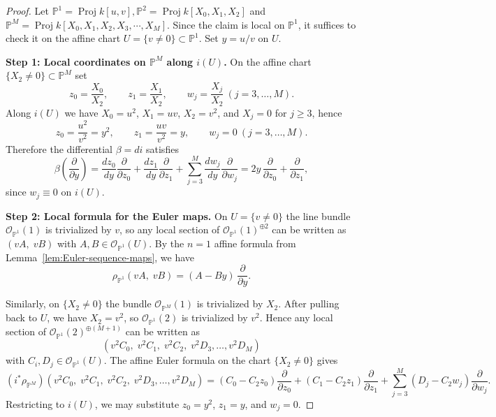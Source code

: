 \documentclass[11pt,twoside]{amsart}
\theoremstyle{plain}
\numberwithin{equation}{section}
\theoremstyle{definition}
\newcommand{\PP}{\mathbb{P}}
\newcommand{\OO}{\mathcal{O}}
\begin{document}
\begin{proof}
Let $\mathbb{P}^1 = \operatorname{Proj}k[u,v], \mathbb{P}^2 = \operatorname{Proj}k[X_0,X_1,X_2]$ and $\mathbb{P}^M = \operatorname{Proj}k[X_0,X_1,X_2,X_3,\cdots, X_M]$.  Since the claim is local on $\PP^1$, it suffices to check it on the affine chart
$U=\{v\neq 0\}\subset \PP^1$.  Set $y=u/v$ on $U$.

\medskip
\noindent\textbf{Step 1: Local coordinates on $\PP^M$ along $i(U)$.}
On the affine chart $\{X_2\neq 0\}\subset \PP^M$ set
\[
z_0=\frac{X_0}{X_2},\qquad z_1=\frac{X_1}{X_2},\qquad w_j=\frac{X_j}{X_2}\ (j=3,\dots,M).
\]
Along $i(U)$ we have $X_0=u^2$, $X_1=uv$, $X_2=v^2$, and $X_j=0$ for $j\ge 3$, hence
\[
z_0=\frac{u^2}{v^2}=y^2,\qquad z_1=\frac{uv}{v^2}=y,\qquad w_j=0\ (j=3,\dots,M).
\]
Therefore the differential $\beta=di$ satisfies
\begin{equation}\label{eq:beta-local-PM}
\beta\!\left(\frac{\partial}{\partial y}\right)
=
\frac{d z_0}{d y}\frac{\partial}{\partial z_0}
+\frac{d z_1}{d y}\frac{\partial}{\partial z_1}
+\sum_{j=3}^M \frac{d w_j}{d y}\frac{\partial}{\partial w_j}
=
2y\,\frac{\partial}{\partial z_0}+\frac{\partial}{\partial z_1},
\end{equation}
since $w_j\equiv 0$ on $i(U)$.

\medskip
\noindent\textbf{Step 2: Local formula for the Euler maps.}
On $U=\{v\neq 0\}$ the line bundle $\OO_{\PP^1}(1)$ is trivialized by $v$, so any local
section of $\OO_{\PP^1}(1)^{\oplus 2}$ can be written as $(vA,\;vB)$ with
$A,B\in \OO_{\PP^1}(U)$.  By the $n=1$ affine formula from Lemma~\ref{lem:Euler-sequence-maps}, we have
\begin{equation}\label{eq:rhoP1-local-PM}
\rho_{\PP^1}(vA,\;vB)=(A-By)\,\frac{\partial}{\partial y}.
\end{equation}

Similarly, on $\{X_2\neq 0\}$ the bundle $\OO_{\PP^M}(1)$ is trivialized by $X_2$.
After pulling back to $U$, we have $X_2=v^2$, so $\OO_{\PP^1}(2)$ is trivialized by $v^2$.
Hence any local section of $\OO_{\PP^1}(2)^{\oplus (M+1)}$ can be written as
\[
(v^2C_0,\;v^2C_1,\;v^2C_2,\;v^2D_3,\dots,v^2D_M)
\]
with $C_i,D_j\in \OO_{\PP^1}(U)$.  The affine Euler formula on the chart $\{X_2\neq 0\}$
gives
\begin{equation}\label{eq:rhoPM-local}
(i^*\rho_{\PP^M})(v^2C_0,\;v^2C_1,\;v^2C_2,\;v^2D_3,\dots,v^2D_M)
=
(C_0-C_2 z_0)\frac{\partial}{\partial z_0}
+(C_1-C_2 z_1)\frac{\partial}{\partial z_1}
+\sum_{j=3}^M (D_j-C_2 w_j)\frac{\partial}{\partial w_j}.
\end{equation}
Restricting to $i(U)$, we may substitute $z_0=y^2$, $z_1=y$, and $w_j=0$.


\end{proof}
\end{document}
